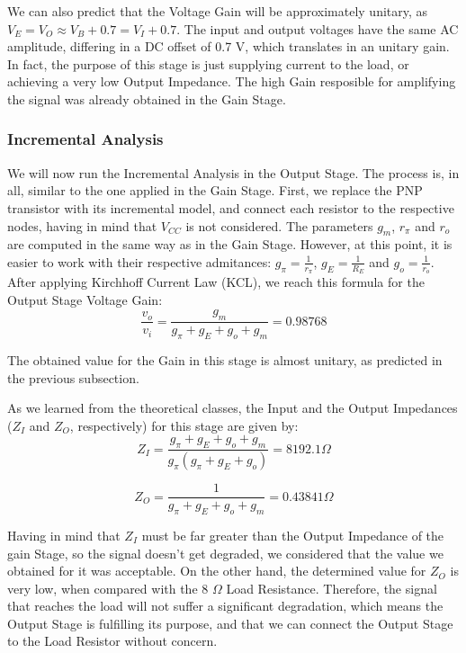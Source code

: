 We can also predict that the Voltage Gain will be approximately unitary, as $V_E = V_O \approx V_B + 0.7 = V_I + 0.7$. The input and output voltages have the same AC amplitude, differing in a DC offset of 0.7 V, which translates in an unitary gain. In fact, the purpose of this stage is just supplying current to the load, or achieving a very low Output Impedance. The high Gain resposible for amplifying the signal was already obtained in the Gain Stage.

\subsubsection{Incremental Analysis}

We will now run the Incremental Analysis in the Output Stage. The process is, in all, similar to the one applied in the Gain Stage. First, we replace the PNP transistor with its incremental model, and connect each resistor to the respective nodes, having in mind that $V_{CC}$ is not considered. The parameters $g_m$, $r_{\pi}$ and $r_o$ are computed in the same way as in the Gain Stage. However, at this point, it is easier to work with their respective admitances: $g_{\pi} = \frac{1}{r_{\pi}}$, $g_{E} = \frac{1}{R_E}$ and $g_{o} = \frac{1}{r_o}$. After applying Kirchhoff Current Law (KCL), we reach this formula for the Output Stage Voltage Gain:
\begin{equation}
\frac{v_o}{v_i} = \frac{g_m}{g_{\pi} + g_E + g_o + g_m} = 0.98768
\label{eq:gainOS}
\end{equation} 

The obtained value for the Gain in this stage is almost unitary, as predicted in the previous subsection.

As we learned from the theoretical classes, the Input and the Output Impedances ($Z_I$ and $Z_O$, respectively) for this stage are given by:
\begin{equation}
Z_I = \frac{g_{\pi} + g_E + g_o + g_m}{g_{\pi} (g_{\pi} + g_E + g_o)} = 8192.1 \Omega
\label{eq:InputImpOS}
\end{equation}

\begin{equation}
Z_O = \frac{1}{g_{\pi} + g_E + g_o + g_m} = 0.43841 \Omega
\label{eq:OutputImpOS}
\end{equation}

Having in mind that $Z_I$ must be far greater than the Output Impedance of the gain Stage, so the signal doesn't get degraded, we considered that the value we obtained for it was acceptable. On the other hand, the determined value for $Z_O$ is very low, when compared with the 8 $\Omega$ Load Resistance. Therefore, the signal that reaches the load will not suffer a significant degradation, which means the Output Stage is fulfilling its purpose, and that we can connect the Output Stage to the Load Resistor without concern.

